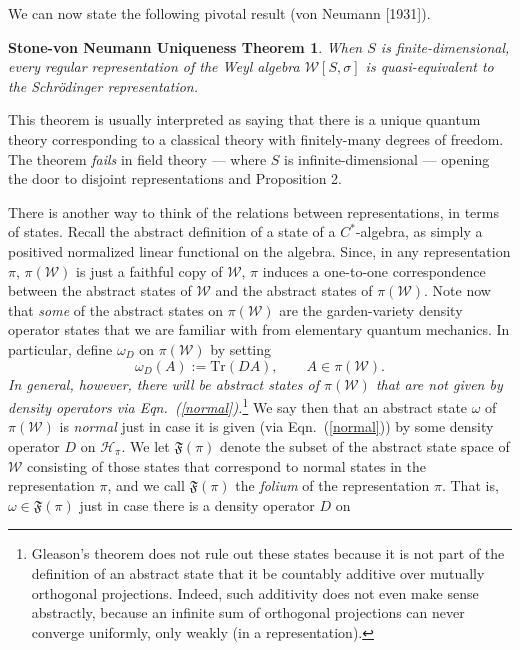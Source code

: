 \documentclass[12pt]{article}
\newtheorem*{sv}{Stone-von Neumann Uniqueness Theorem}
\theoremstyle{remark}
\theoremstyle{definition}
\newcommand{\alg}[1]{\mathcal{#1}}
\newcommand{\hil}[1]{\mathcal{#1}}
\begin{document}
We can now state the following pivotal result (von Neumann [1931]).
\begin{sv} When $S$ is finite-dimensional, every regular 
representation of the Weyl algebra $\alg{W}[S,\sigma]$ is 
quasi-equivalent to the Schr\"{o}dinger representation. 
\end{sv}
\noindent This theorem is usually interpreted
as saying that there is a unique quantum theory corresponding
to a classical theory with finitely-many degrees of freedom.     
The theorem \emph{fails} in field theory --- where $S$ is 
infinite-dimensional --- opening the door to disjoint 
representations and Proposition 2.  

There is another way to think of the relations between representations,
in terms of states.  Recall the abstract definition of a 
state of a $C^{*}$-algebra, as simply 
a positived normalized linear functional on the algebra. 
Since, in any representation $\pi$, $\pi (\alg{W})$ is just a 
faithful copy of 
$\alg{W}$, $\pi$ induces a one-to-one correspondence between the abstract
states of $\alg{W}$ and the abstract states of $\pi (\alg{W})$.
Note now
that \emph{some} of the abstract states on $\pi (\alg{W})$ are the
garden-variety density operator states that we are familiar with from
elementary quantum mechanics.  In particular, define $\omega _{D}$ on $\pi (\alg{W})$
by setting
\begin{equation} \omega _{D}(A):=\mathrm{Tr}(DA) ,\qquad A\in \pi
  (\alg{W}). \label{normal}
\end{equation}
\emph{In general, however, there will be abstract states of $\pi
  (\alg{W})$ that are not given by density operators via
  Eqn.~(\ref{normal}).}\footnote{\label{count} Gleason's theorem does
  not rule out these states because it is not part of the definition
  of an abstract state that it be countably additive over mutually
  orthogonal projections.  Indeed, such additivity does not even make
  sense abstractly, because an infinite sum of orthogonal projections
  can never converge uniformly, only weakly (in a representation).} We
say then that an abstract state $\omega$ of $\pi (\alg{W})$ is
\emph{normal} just in case it is given (via Eqn.~(\ref{normal})) by
some density operator $D$ on $\hil{H}_{\pi}$.  We let
$\mathfrak{F}(\pi )$ denote the subset of the abstract state space of
$\alg{W}$ consisting of those states that correspond to normal states
in the representation $\pi$, and we call $\mathfrak{F}(\pi )$ the
\emph{folium} of the representation $\pi$.  That is, $\omega \in
\mathfrak{F}(\pi )$ just in case there is a density operator $D$ on
\end{document}

